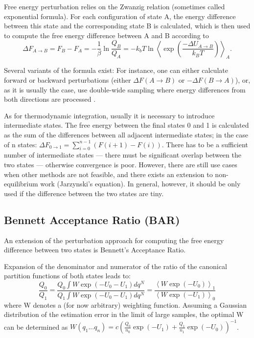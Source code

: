 Free energy perturbation relies on the Zwanzig relation (sometimes called exponential
formula). For each configuration of state A, the energy difference
between this state and the corresponding state B is calculated, which is then used to compute the free energy difference between A and B according to \cite{Zwanzig.1954,Gapsys.2015}
\begin{equation}
\Delta F_{A\rightarrow B}=F_{B}-F_{A}=-\frac{1}{\beta}\ln\frac{Q_{B}}{Q_{A}}=-k_{b}T\ln\left\langle \exp\left(\frac{-\Delta U_{A\rightarrow B}}{k_{B}T}\right)\right\rangle _{A}.
\end{equation}

Several variants of the formula exist: For instance, one can either
calculate forward or backward perturbations (either $\Delta F\left(A\rightarrow B\right)$ or
$-\Delta F\left(B\rightarrow A\right)$), or, as it is
usually the case, use double-wide sampling where energy differences
from both directions are processed \cite{Bruckner.2011}.

As for thermodynamic integration, usually it is necessary to
introduce intermediate states. The free energy between the final states
0 and 1 is calculated as the sum of the differences between all adjacent
intermediate states; in the case of n states: $\Delta F_{0\rightarrow1}=\sum_{i=0}^{n-1}\left(F\left(i+1\right)-F\left(i\right)\right)$.
There has to be a sufficient number of intermediate states --- there must be significant overlap between the two states --- otherwise convergence is poor.
However, there are still use cases when other methods are not feasible\cite{Boresch.2017},
and there exists an extension to non-equilibrium work (Jarzynski's
equation)\cite{Boresch.2017}. In general, however, it should be only used
if the difference between the two states are tiny\cite{Shirts.2013}.

\subsection{Bennett Acceptance Ratio (BAR)}

An extension of the perturbation approach for computing the free energy difference between
two states is Bennett's Acceptance Ratio\cite{Bennett.1976}. 

Expansion of the denominator and numerator of the ratio of the canonical
partition functions of both states leads to: 
\begin{equation}
\frac{Q_{0}}{Q_{1}}=\frac{Q_{0}\int W\exp\left(-U_{0}-U_{1}\right)dq^{N}}{Q_{1}\int W\exp\left(-U_{0}-U_{1}\right)dq^{N}}=\frac{\left\langle W\exp\left(-U_{0}\right)\right\rangle _{1}}{\left\langle W\exp\left(-U_{1}\right)\right\rangle _{0}}
\end{equation}
where W denotes a (for now arbitrary) weighting function. Assuming
a Gaussian distribution of the estimation error in the limit of large
samples, the optimal W can be determined as $W\left(q_{1}...q_{n}\right)=c\left(\frac{Q_{0}}{n_{0}}\exp\left(-U_{1}\right)+\frac{Q_{1}}{n_{1}}\exp\left(-U_{0}\right)\right)^{-1}$\cite{Bennett.1976}. 

